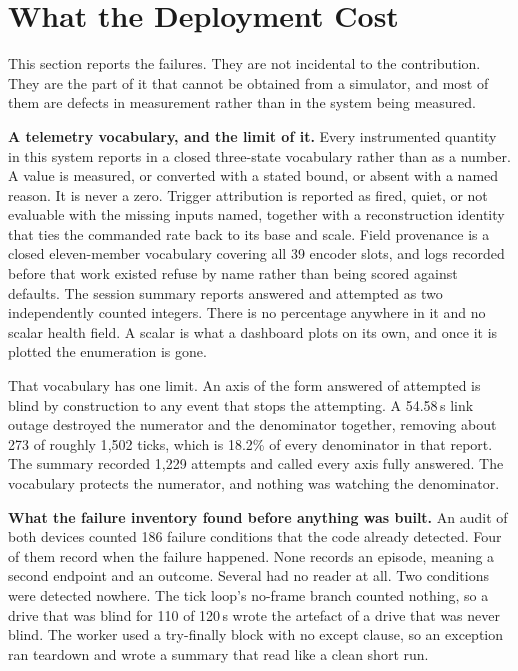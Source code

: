 \section{What the Deployment Cost}
\label{sec:experience}

This section reports the failures. They are not incidental to the contribution.
They are the part of it that cannot be obtained from a simulator, and most of
them are defects in measurement rather than in the system being measured.

\noindent\textbf{A telemetry vocabulary, and the limit of it.}
Every instrumented quantity in this system reports in a closed three-state
vocabulary rather than as a number. A value is measured, or converted with a
stated bound, or absent with a named reason. It is never a zero. Trigger
attribution is reported as fired, quiet, or not evaluable with the missing
inputs named, together with a reconstruction identity that ties the commanded
rate back to its base and scale. Field provenance is a closed eleven-member
vocabulary covering all 39 encoder slots, and logs recorded before that work
existed refuse by name rather than being scored against defaults. The session
summary reports answered and attempted as two independently counted integers.
There is no percentage anywhere in it and no scalar health field. A scalar is
what a dashboard plots on its own, and once it is plotted the enumeration is
gone.

That vocabulary has one limit. An axis of the form answered of attempted is
blind by construction to any event that stops the attempting. A 54.58\,s link outage destroyed the numerator and the denominator
together, removing about 273 of roughly 1{,}502 ticks, which is 18.2\% of every
denominator in that report. The summary recorded 1{,}229 attempts and called
every axis fully answered. The vocabulary protects the numerator, and nothing
was watching the denominator.

\noindent\textbf{What the failure inventory found before anything was built.}
An audit of both devices counted 186 failure conditions that the code already
detected. Four of them record when the failure happened. None records an
episode, meaning a second endpoint and an outcome. Several had no reader at all.
Two conditions were detected nowhere. The tick loop's no-frame branch counted
nothing, so a drive that was blind for 110 of 120\,s wrote the artefact of a
drive that was never blind. The worker used a try-finally block with no except
clause, so an exception ran teardown and wrote a summary that read like a clean
short run.

